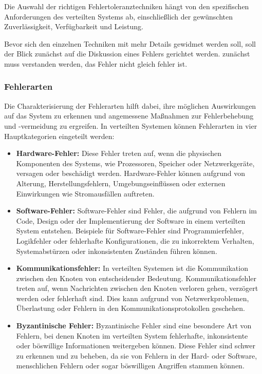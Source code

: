 \documentclass[../vs-script-first-v01.tex]{subfiles}
\begin{document}
Die Auswahl der richtigen Fehlertoleranztechniken hängt von den spezifischen Anforderungen des verteilten Systems ab, einschließlich der gewünschten Zuverlässigkeit, Verfügbarkeit und Leistung.

Bevor sich den einzelnen Techniken mit mehr Details gewidmet werden soll, soll der Blick zunächst auf die Diskussion eines Fehlers gerichtet werden. zunächst muss verstanden werden, das Fehler nicht gleich fehler ist. 
\subsubsection{Fehlerarten}
Die Charakterisierung der Fehlerarten hilft dabei, ihre möglichen Auswirkungen auf das System zu erkennen und angemessene Maßnahmen zur Fehlerbehebung und -vermeidung zu ergreifen.
In verteilten Systemen können Fehlerarten in vier Hauptkategorien eingeteilt werden:
\begin{itemize}
\item \textbf{Hardware-Fehler:} Diese Fehler treten auf, wenn die physischen Komponenten des Systems, wie Prozessoren, Speicher oder Netzwerkgeräte, versagen oder beschädigt werden. Hardware-Fehler können aufgrund von Alterung, Herstellungsfehlern, Umgebungseinflüssen oder externen Einwirkungen wie Stromausfällen auftreten.
\item \textbf{Software-Fehler:} Software-Fehler sind Fehler, die aufgrund von Fehlern im Code, Design oder der Implementierung der Software in einem verteilten System entstehen. Beispiele für Software-Fehler sind Programmierfehler, Logikfehler oder fehlerhafte Konfigurationen, die zu inkorrektem Verhalten, Systemabstürzen oder inkonsistenten Zuständen führen können.
\item \textbf{Kommunikationsfehler:} In verteilten Systemen ist die Kommunikation zwischen den Knoten von entscheidender Bedeutung. Kommunikationsfehler treten auf, wenn Nachrichten zwischen den Knoten verloren gehen, verzögert werden oder fehlerhaft sind. Dies kann aufgrund von Netzwerkproblemen, Überlastung oder Fehlern in den Kommunikationsprotokollen geschehen.
\item \textbf{Byzantinische Fehler:} Byzantinische Fehler sind eine besondere Art von Fehlern, bei denen Knoten im verteilten System fehlerhafte, inkonsistente oder böswillige Informationen weitergeben können. Diese Fehler sind schwer zu erkennen und zu beheben, da sie von Fehlern in der Hard- oder Software, menschlichen Fehlern oder sogar böswilligen Angriffen stammen können.
\end{itemize}
\end{document}
